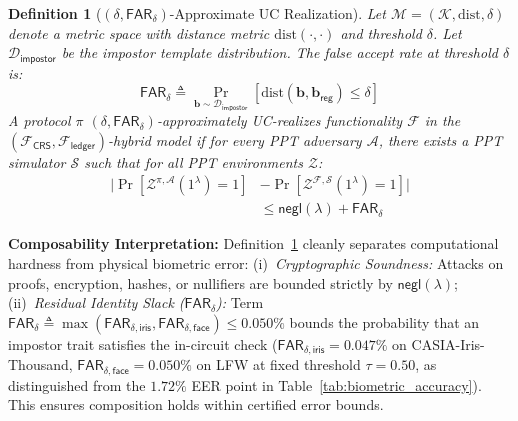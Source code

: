 \documentclass[10pt,letterpaper,journal]{IEEEtran}
\newtheorem{definition}[theorem]{Definition}
\begin{document}
\begin{definition}[$(\delta, \mathsf{FAR}_\delta)$-Approximate UC Realization]
\label{def:approx-uc}
Let $\mathcal{M} = (\mathcal{K}, \mathrm{dist}, \delta)$ denote a metric space with distance metric $\mathrm{dist}(\cdot, \cdot)$ and threshold $\delta$. Let $\mathcal{D}_{\mathsf{impostor}}$ be the impostor template distribution. The false accept rate at threshold $\delta$ is:
\begin{equation}
  \mathsf{FAR}_\delta \triangleq \Pr_{\mathbf{b} \sim \mathcal{D}_{\mathsf{impostor}}}\left[\mathrm{dist}(\mathbf{b}, \mathbf{b}_{\mathsf{reg}}) \leq \delta\right]
\end{equation}
A protocol $\pi$ $(\delta, \mathsf{FAR}_\delta)$-approximately UC-realizes functionality $\mathcal{F}$ in the $(\mathcal{F}_{\mathsf{CRS}}, \mathcal{F}_{\mathsf{ledger}})$-hybrid model if for every PPT adversary $\mathcal{A}$, there exists a PPT simulator $\mathcal{S}$ such that for all PPT environments $\mathcal{Z}$:
\begin{equation}
\label{eq:approx-uc-bound}
\begin{split}
  \bigl|\Pr[\mathcal{Z}^{\pi, \mathcal{A}}(1^\lambda) = 1] &- \Pr[\mathcal{Z}^{\mathcal{F}, \mathcal{S}}(1^\lambda) = 1]\bigr| \\
  &\leq \mathsf{negl}(\lambda) + \mathsf{FAR}_\delta
\end{split}
\end{equation}
\end{definition}

\noindent\textbf{Composability Interpretation:} Definition~\ref{def:approx-uc} cleanly separates computational hardness from physical biometric error: (i)~\emph{Cryptographic Soundness:} Attacks on proofs, encryption, hashes, or nullifiers are bounded strictly by $\mathsf{negl}(\lambda)$; (ii)~\emph{Residual Identity Slack ($\mathsf{FAR}_\delta$):} Term $\mathsf{FAR}_\delta \triangleq \max(\mathsf{FAR}_{\delta,\mathsf{iris}}, \mathsf{FAR}_{\delta,\mathsf{face}}) \leq 0.050\%$ bounds the probability that an impostor trait satisfies the in-circuit check ($\mathsf{FAR}_{\delta,\mathsf{iris}} = 0.047\%$ on CASIA-Iris-Thousand, $\mathsf{FAR}_{\delta,\mathsf{face}} = 0.050\%$ on LFW at fixed threshold $\tau = 0.50$, as distinguished from the $1.72\%$ EER point in Table~\ref{tab:biometric_accuracy}). This ensures composition holds within certified error bounds.
\end{document}
